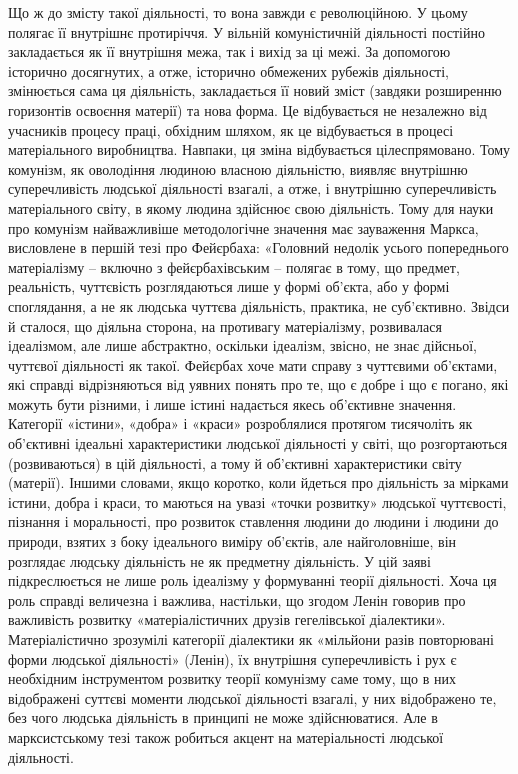 \documentclass[../main]{subfiles}
\begin{document}
Що ж до змісту такої діяльності, то вона завжди є революційною. У цьому полягає її внутрішнє протиріччя. У вільній комуністичній діяльності постійно закладається як її внутрішня межа, так і вихід за ці межі. За допомогою історично досягнутих, а отже, історично обмежених рубежів діяльності, змінюється сама ця діяльність, закладається її новий зміст (завдяки розширенню горизонтів освоєння матерії) та нова форма. Це відбувається не незалежно від учасників процесу праці, обхідним шляхом, як це відбувається в процесі матеріального виробництва. Навпаки, ця зміна відбувається цілеспрямовано. Тому комунізм, як оволодіння людиною власною діяльністю, виявляє внутрішню суперечливість людської діяльності взагалі, а отже, і внутрішню суперечливість матеріального світу, в якому людина здійснює свою діяльність. Тому для науки про комунізм найважливіше методологічне значення має зауваження Маркса, висловлене в першій тезі про Фейєрбаха: «Головний недолік усього попереднього матеріалізму – включно з фейєрбахівським – полягає в тому, що предмет, реальність, чуттєвість розглядаються лише у формі об’єкта, або у формі споглядання, а не як людська чуттєва діяльність, практика, не суб’єктивно. Звідси й сталося, що діяльна сторона, на противагу матеріалізму, розвивалася ідеалізмом, але лише абстрактно, оскільки ідеалізм, звісно, не знає дійсньої, чуттєвої діяльності як такої. Фейєрбах хоче мати справу з чуттєвими об’єктами, які справді відрізняються від уявних понять про те, що є добре і що є погано, які можуть бути різними, і лише істині надається якесь об’єктивне значення. Категорії «істини», «добра» і «краси» розроблялися протягом тисячоліть як об’єктивні ідеальні характеристики людської діяльності у світі, що розгортаються (розвиваються) в цій діяльності, а тому й об’єктивні характеристики світу (матерії). Іншими словами, якщо коротко, коли йдеться про діяльність за мірками істини, добра і краси, то маються на увазі «точки розвитку» людської чуттєвості, пізнання і моральності, про розвиток ставлення людини до людини і людини до природи, взятих з боку ідеального виміру об’єктів, але найголовніше, він розглядає людську діяльність не як предметну діяльність. У цій заяві підкреслюється не лише роль ідеалізму у формуванні теорії діяльності. Хоча ця роль справді величезна і важлива, настільки, що згодом Ленін говорив про важливість розвитку «матеріалістичних друзів гегелівської діалектики». Матеріалістично зрозумілі категорії діалектики як «мільйони разів повторювані форми людської діяльності» (Ленін), їх внутрішня суперечливість і рух є необхідним інструментом розвитку теорії комунізму саме тому, що в них відображені суттєві моменти людської діяльності взагалі, у них відображено те, без чого людська діяльність в принципі не може здійснюватися. Але в марксистському тезі також робиться акцент на матеріальності людської діяльності.
\end{document}
